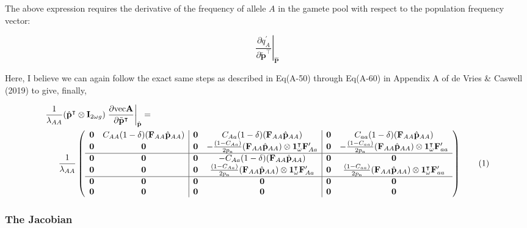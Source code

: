 \documentclass[11pt]{article}
\newcommand\numberthis{\addtocounter{equation}{1}\tag{\theequation}}
\def\mbf#1{\mathbf{#1}}
\begin{document}
The above expression requires the derivative of the frequency of allele $A$ in the gamete pool with respect to the population frequency vector:

\begin{equation}
	\left. \frac{\partial q^{\prime}_{A}}{\partial \tilde{\mbf{p}}^{\intercal}} \right|_{\hat{\mbf{P}}}
\end{equation}

\noindent Here, I believe we can again follow the exact same steps as described in Eq(A-50) through Eq(A-60) in Appendix A of de Vries \& Caswell (2019) to give, finally, 

\begin{align*}
	\frac{1}{\lambda_{AA}} (\hat{\mbf{p}}^{\intercal} &\otimes \mbf{I}_{2 \omega g}) \left. \frac{\partial \text{vec}\mbf{A}}{\partial \tilde{\mbf{p}}^{\intercal}} \right|_{\hat{\mbf{p}}} = \\
	\frac{1}{\lambda_{AA}} &\left(
			\begin{array}{cc|cc|cc}
				\mbf{0} & C_{AA}(1 - \delta) (\mbf{F}_{AA} \hat{\mbf{p}}_{AA}) & \mbf{0} & C_{Aa}(1 - \delta) (\mbf{F}_{AA} \hat{\mbf{p}}_{AA}) & \mbf{0} & C_{aa}(1 - \delta) (\mbf{F}_{AA} \hat{\mbf{p}}_{AA}) \\
				\mbf{0} & \mbf{0} & \mbf{0} & -\frac{(1 - C_{Aa})}{2 p_{\text{n}}} (\mbf{F}_{AA} \hat{\mbf{p}}_{AA}) \otimes \mbf{1}^{\intercal}_{\omega} \mbf{F}^{\prime}_{Aa} & \mbf{0} & -\frac{(1 - C_{aa})}{2 p_{\text{n}}} (\mbf{F}_{AA} \hat{\mbf{p}}_{AA}) \otimes \mbf{1}^{\intercal}_{\omega} \mbf{F}^{\prime}_{aa} \\ \hline
				\mbf{0} & \mbf{0} & \mbf{0} & -C_{Aa}(1 - \delta) (\mbf{F}_{AA} \hat{\mbf{p}}_{AA}) & \mbf{0} & \mbf{0} \\
				\mbf{0} & \mbf{0} & \mbf{0} & \frac{(1 - C_{Aa})}{2 p_{\text{n}}} (\mbf{F}_{AA} \hat{\mbf{p}}_{AA}) \otimes \mbf{1}^{\intercal}_{\omega} \mbf{F}^{\prime}_{Aa} & \mbf{0} & \frac{(1 - C_{aa})}{2 p_{\text{n}}} (\mbf{F}_{AA} \hat{\mbf{p}}_{AA}) \otimes \mbf{1}^{\intercal}_{\omega} \mbf{F}^{\prime}_{aa} \\ \hline
				\mbf{0} & \mbf{0} & \mbf{0} & \mbf{0} & \mbf{0} & \mbf{0} \\ 
				\mbf{0} & \mbf{0} & \mbf{0} & \mbf{0} & \mbf{0} & \mbf{0} 
			\end{array} \right)  \numberthis			
\end{align*}


\subsubsection{The Jacobian}
\end{document}
